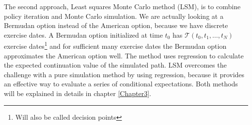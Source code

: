 The second approach, Least squares Monte Carlo method (LSM), is to combine policy iteration and Monte Carlo simulation. We are actually looking at a Bermudan option instead of the American option, because we have discrete exercise dates. A Bermudan option initialized at time $t_0$ has $\mathcal{T}(t_0,t_1,\ldots,t_N)$ exercise dates\footnote{Will also be called decision points} and for sufficient many exercise dates the Bermudan option approximates the American option well. The method uses regression to calculate the expected continuation value of the simulated path. LSM overcomes the challenge with a pure simulation method by using regression, because it provides an effective way to evaluate a series of conditional expectations. Both methods will be explained in details in chapter \ref{Chapter3}.





